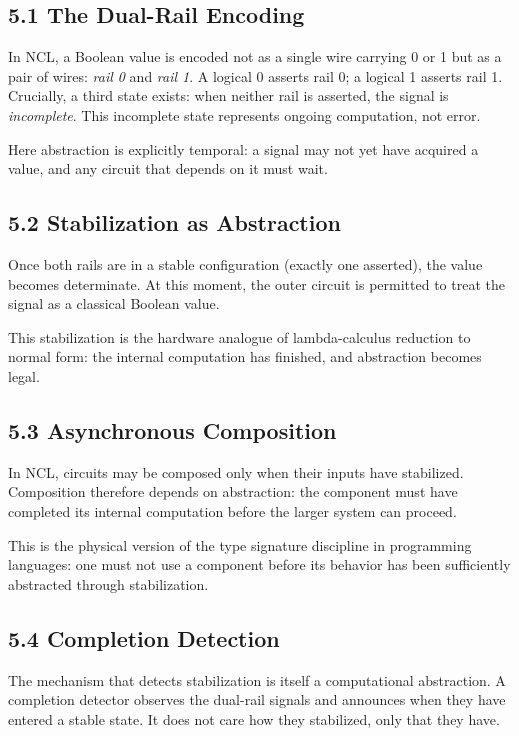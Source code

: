 \documentclass[12pt,letterpaper]{article}
\theoremstyle{remark}
\begin{document}
\subsection{5.1 The Dual-Rail Encoding}

In NCL, a Boolean value is encoded not as a single wire carrying 0 or 1 but as a pair of wires: \emph{rail 0} and \emph{rail 1}. A logical 0 asserts rail 0; a logical 1 asserts rail 1. Crucially, a third state exists: when neither rail is asserted, the signal is \emph{incomplete}. This incomplete state represents ongoing computation, not error.

Here abstraction is explicitly temporal: a signal may not yet have acquired a value, and any circuit that depends on it must wait.

\subsection{5.2 Stabilization as Abstraction}

Once both rails are in a stable configuration (exactly one asserted), the value becomes determinate. At this moment, the outer circuit is permitted to treat the signal as a classical Boolean value.

This stabilization is the hardware analogue of lambda-calculus reduction to normal form: the internal computation has finished, and abstraction becomes legal.

\subsection{5.3 Asynchronous Composition}

In NCL, circuits may be composed only when their inputs have stabilized. Composition therefore depends on abstraction: the component must have completed its internal computation before the larger system can proceed.

This is the physical version of the type signature discipline in programming languages: one must not use a component before its behavior has been sufficiently abstracted through stabilization.

\subsection{5.4 Completion Detection}

The mechanism that detects stabilization is itself a computational abstraction. A completion detector observes the dual-rail signals and announces when they have entered a stable state. It does not care how they stabilized, only that they have.
\end{document}
